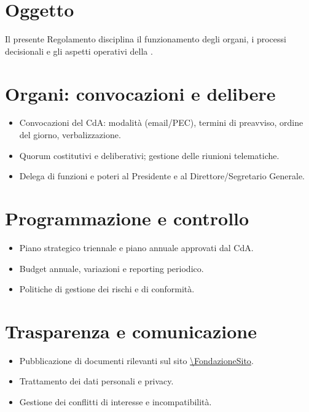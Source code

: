 \begin{center}
\end{center}

\maketitle

\section*{Oggetto}
Il presente Regolamento disciplina il funzionamento degli organi, i processi decisionali e gli aspetti operativi della \FondazioneNome.

\section*{Organi: convocazioni e delibere}
\begin{itemize}
  \item Convocazioni del CdA: modalità (email/PEC), termini di preavviso, ordine del giorno, verbalizzazione.
  \item Quorum costitutivi e deliberativi; gestione delle riunioni telematiche.
  \item Delega di funzioni e poteri al Presidente e al Direttore/Segretario Generale.
\end{itemize}

\section*{Programmazione e controllo}
\begin{itemize}
  \item Piano strategico triennale e piano annuale approvati dal CdA.
  \item Budget annuale, variazioni e reporting periodico.
  \item Politiche di gestione dei rischi e di conformità.
\end{itemize}

\section*{Trasparenza e comunicazione}
\begin{itemize}
  \item Pubblicazione di documenti rilevanti sul sito \url{\FondazioneSito}.
  \item Trattamento dei dati personali e privacy.
  \item Gestione dei conflitti di interesse e incompatibilità.
\end{itemize}


